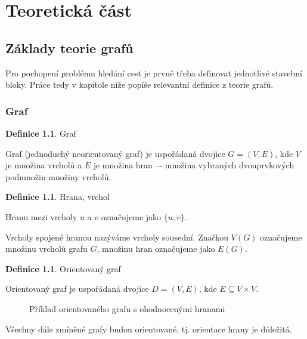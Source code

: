 \documentclass[thesis=M,czech]{FITthesis}[2019/12/23]
\theoremstyle{plain}
\theoremstyle{definition}
\newtheorem{defn}[thm]{Definice} %
\begin{document}
\chapter{Teoretická část}
\section{Základy teorie grafů}

Pro pochopení problému hledání cest je prvně třeba definovat jednotlivé stavební bloky. Práce tedy v kapitole níže popíše relevantní definice z teorie grafů.

\subsection{Graf}

\begin{defn}{Graf}\label{thm:graf}
	
Graf (jednoduchý neorientovaný graf) je uspořádaná dvojice $G = (V,E)$, kde $V$ je množina vrcholů a $E$ je množina hran –- množina vybraných dvouprvkových podmnožin množiny vrcholů. \cite{zaklady-teorie-grafu}

\end{defn}

\begin{defn}{Hrana, vrchol}\label{thm:graf}

Hranu mezi vrcholy $u$ a $v$ označujeme jako $\{u, v\}$. 

Vrcholy spojené hranou nazýváme vrcholy sousední. Značkou $V(G)$ označujeme množinu vrcholů grafu $G$, množinu hran označujeme jako $E(G)$. \cite{zaklady-teorie-grafu}

\end{defn}

\begin{defn}{Orientovaný graf}\label{thm:graf}

Orientovaný graf je uspořádaná dvojice $D = (V, E)$, kde $E \subseteq V \times V$. \cite{zaklady-teorie-grafu}

\end{defn}

\begin{figure}[H]\centering
	

	\caption[Příklad orientovaného grafu s ohodnocenými hranami]{Příklad orientovaného grafu s ohodnocenými hranami}\label{fig:float}
\end{figure}


Všechny dále zmíněné grafy budou orientované, tj. orientace hrany je důležitá.
\end{document}

